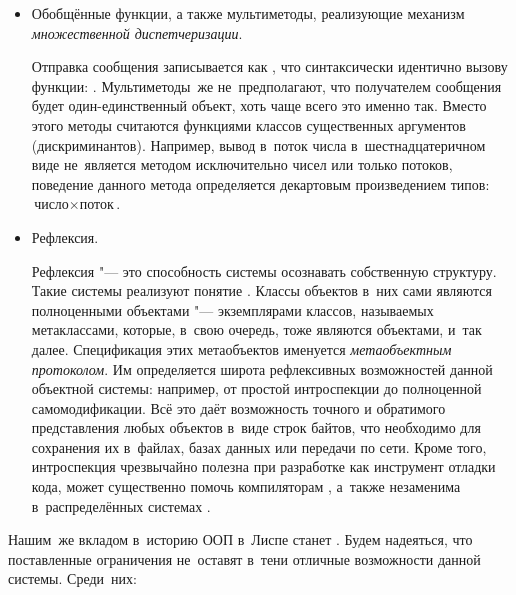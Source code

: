 \begin{itemize}
  \item Обобщённые функции, а также мультиметоды, реализующие механизм
        \emph{множественной диспетчеризации}.

        Отправка сообщения записывается как , что синтаксически идентично вызову
        функции: . Мультиметоды~же
        не~предполагают, что получателем сообщения будет один-единственный
        объект, хоть чаще всего это именно так. Вместо этого методы
        считаются функциями классов существенных аргументов
        (дискриминантов). Например, вывод в~поток числа в~шестнадцатеричном
        виде не~является методом исключительно чисел или только потоков,
        поведение данного метода определяется декартовым произведением
        типов: $\text{число} \times \text{поток}$.

  \item Рефлексия.

        Рефлексия "--- это способность системы осознавать собственную
        структуру. Такие системы реализуют понятие .
        Классы объектов в~них сами являются полноценными объектами "---
        экземплярами классов, называемых метаклассами, которые, в~свою
        очередь, тоже являются объектами, и~так далее. Спецификация
        этих метаобъектов именуется \emph{метаобъектным протоколом}. Им
        определяется широта рефлексивных возможностей данной объектной
        системы: например, от простой интроспекции до полноценной
        самомодификации. Всё это даёт возможность точного и обратимого
        представления любых объектов в~виде строк байтов, что необходимо
        для сохранения их в~файлах, базах данных или передачи по сети.
        Кроме того, интроспекция чрезвычайно полезна при разработке как
        инструмент отладки кода, может существенно помочь компиляторам
        , а~также незаменима
        в~распределённых системах \cite{que94}.
\end{itemize}

Нашим~же вкладом в~историю ООП в~Лиспе станет {\Meroonet}. Будем надеяться, что
поставленные ограничения не~оставят в~тени отличные возможности данной системы.
Среди~них:

